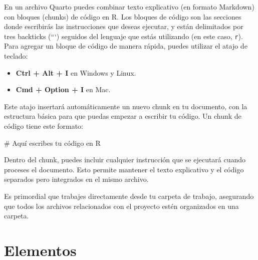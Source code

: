 \documentclass[
  letterpaper,
  DIV=11,
  numbers=noendperiod,
  twoside]{scrreprt}
\newenvironment{Shaded}{\begin{snugshade}}{\end{snugshade}}
\newcommand{\CommentTok}[1]{\textcolor[rgb]{0.37,0.37,0.37}{#1}}
\providecommand{\tightlist}{%
  \setlength{\itemsep}{0pt}\setlength{\parskip}{0pt}}\usepackage{longtable,booktabs,array}
\begin{document}
En un archivo Quarto puedes combinar texto explicativo (en formato
Markdown) con bloques (chunks) de código en R. Los bloques de código son
las secciones donde escribirás las instrucciones que deseas ejecutar, y
están delimitados por tres backticks (```) seguidos del lenguaje que
estás utilizando (en este caso, \texttt{r}). Para agregar un bloque de
código de manera rápida, puedes utilizar el atajo de teclado:

\begin{itemize}
\tightlist
\item
  \textbf{Ctrl + Alt + I} en Windows y Linux.
\item
  \textbf{Cmd + Option + I} en Mac.
\end{itemize}

Este atajo insertará automáticamente un nuevo chunk en tu documento, con
la estructura básica para que puedas empezar a escribir tu código. Un
chunk de código tiene este formato:

\begin{Shaded}
\begin{Highlighting}[]
\CommentTok{\# Aquí escribes tu código en R}
\end{Highlighting}
\end{Shaded}

Dentro del chunk, puedes incluir cualquier instrucción que se ejecutará
cuando proceses el documento. Esto permite mantener el texto explicativo
y el código separados pero integrados en el mismo archivo.

\begin{tcolorbox}[enhanced jigsaw, titlerule=0mm, title=\textcolor{quarto-callout-important-color}{\faExclamation}\hspace{0.5em}{Importante}, colback=white, opacityback=0, breakable, toprule=.15mm, left=2mm, leftrule=.75mm, colframe=quarto-callout-important-color-frame, bottomtitle=1mm, rightrule=.15mm, opacitybacktitle=0.6, coltitle=black, arc=.35mm, bottomrule=.15mm, toptitle=1mm, colbacktitle=quarto-callout-important-color!10!white]

Es primordial que trabajes directamente desde tu carpeta de trabajo,
asegurando que todos los archivos relacionados con el proyecto estén
organizados en una carpeta.

\end{tcolorbox}

\chapter{Elementos}\label{elementos}
\end{document}
